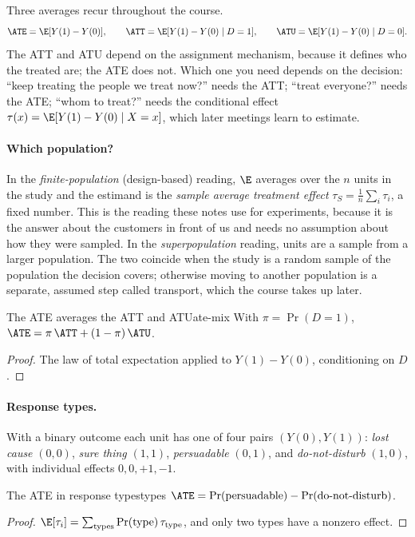 \documentclass[11pt]{article}
\begin{document}
Three averages recur throughout the course.
\[
  \ATE = \E[Y(1) - Y(0)], \qquad \ATT = \E[Y(1) - Y(0) \mid D = 1], \qquad \ATU = \E[Y(1) - Y(0) \mid D = 0].
\]
The ATT and ATU depend on the assignment mechanism, because it defines who the treated are; the ATE does
not. Which one you need depends on the decision: ``keep treating the people we treat now?'' needs the ATT;
``treat everyone?'' needs the ATE; ``whom to treat?'' needs the conditional effect
$\tau(x) = \E[Y(1) - Y(0) \mid X = x]$, which later meetings learn to estimate.

\paragraph{Which population?} In the \emph{finite-population} (design-based) reading, $\E$ averages over
the $n$ units in the study and the estimand is the \emph{sample average treatment effect}
$\tau_S = \frac1n \sum_i \tau_i$, a fixed number. This is the reading these notes use for experiments,
because it is the answer about the customers in front of us and needs no assumption about how they were
sampled. In the \emph{superpopulation} reading, units are a sample from a larger population. The two
coincide when the study is a random sample of the population the decision covers; otherwise moving to
another population is a separate, assumed step called transport, which the course takes up later.

\begin{prop}{The ATE averages the ATT and ATU}{ate-mix}
With $\pi = \Pr(D=1)$, \quad $\ATE = \pi\,\ATT + (1-\pi)\,\ATU$.
\end{prop}
\begin{proof}
The law of total expectation applied to $Y(1) - Y(0)$, conditioning on $D$.
\end{proof}

\paragraph{Response types.} With a binary outcome each unit has one of four pairs $(Y(0), Y(1))$:
\emph{lost cause} $(0,0)$, \emph{sure thing} $(1,1)$, \emph{persuadable} $(0,1)$, and \emph{do-not-disturb}
$(1,0)$, with individual effects $0, 0, +1, -1$.

\begin{prop}{The ATE in response types}{types}
$\ATE = \Pr(\text{persuadable}) - \Pr(\text{do-not-disturb})$.
\end{prop}
\begin{proof}
$\E[\tau_i] = \sum_{\text{types}} \Pr(\text{type})\,\tau_{\text{type}}$, and only two types have a nonzero
effect.
\end{proof}
\end{document}
